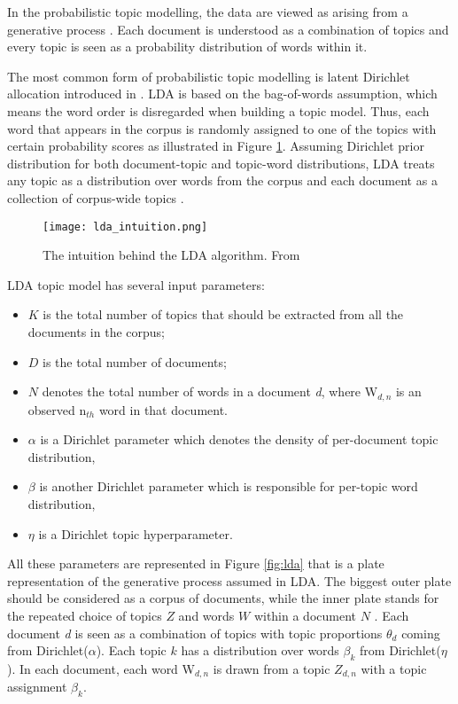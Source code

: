 \documentclass[fontsize=12pt,a4paper,twoside,openany]{scrbook}
\begin{document}
In the probabilistic topic modelling, the data are viewed as arising from a generative process \parencite{Blei12}. Each document is understood as a combination of topics and every topic is seen as a probability distribution of words within it. 

The most common form of probabilistic topic modelling is latent Dirichlet allocation introduced in \parencite{Blei03}. LDA is based on the bag-of-words assumption, which means the word order is disregarded when building a topic model. Thus, each word that appears in the corpus is randomly assigned to one of the topics with certain probability scores as illustrated in Figure \ref{fig:lda_intuition}. Assuming Dirichlet prior distribution for both document-topic and topic-word distributions, LDA treats any topic as a distribution over words from the corpus and each document as a collection of corpus-wide topics \parencite{Blei03}.

\begin{figure}[h]
\centering
\texttt{[image: lda\_intuition.png]}
\caption{The intuition behind the LDA algorithm. From \parencite{Blei12}}
\label{fig:lda_intuition}
\end{figure}

LDA topic model has several input parameters:
\begin{itemize}
  \item \(K\) is the total number of topics that should be extracted from all the documents in the corpus;
  \item \(D\) is the total number of documents;
  \item \(N\) denotes the total number of words in a document \emph{d}, where W\(_{d,n}\) is an observed n\(_{th}\) word in that document.
  \item \(\alpha\) is a Dirichlet parameter which denotes the density of per-document topic distribution,
  \item \(\beta\) is another Dirichlet parameter which is responsible for per-topic word distribution,
  \item \(\eta\) is a Dirichlet topic hyperparameter.
\end{itemize}

All these parameters are represented in Figure \ref{fig:lda} that is a plate representation of the generative process assumed in LDA. The biggest outer plate should be considered as a corpus of documents, while the inner plate stands for the repeated choice of topics \(Z\) and words \(W\) within a document \(N\) \parencite[see also][p.~997]{Blei12}. Each document \emph{d} is seen as a combination of topics with topic proportions \(\theta_{d}\) coming from Dirichlet(\(\alpha\)). Each topic \(k\) has a distribution over words \(\beta_{k}\) from Dirichlet(\(\eta\)). In each document, each word W\(_{d,n}\) is drawn from a topic \(Z_{d,n}\) with a topic assignment \(\beta_{k}\). 
\end{document}

